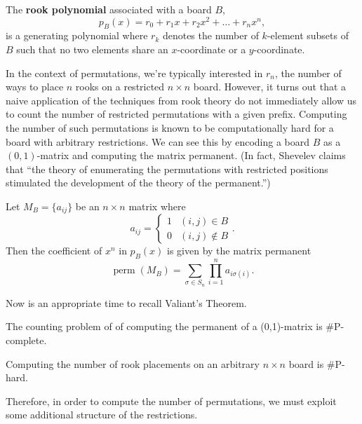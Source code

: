 \begin{definition}
  The \textbf{rook polynomial} associated with a board $B$,
  \[
    p_B(x) = r_0 + r_1 x + r_2 x^2 + \dots + r_n x^n,
  \]
  is a generating polynomial where $r_k$ denotes the number of $k$-element subsets
  of $B$ such that no two elements share an $x$-coordinate or a $y$-coordinate.
\end{definition}

In the context of permutations, we're typically interested in $r_n$, the number
of ways to place $n$ rooks on a restricted $n \times n$ board.
However, it turns out that a naive application of the techniques from
rook theory do not immediately allow us to count the number of
restricted permutations with a given prefix.
Computing the number of such permutations is known to be computationally hard
for a board with arbitrary restrictions.
We can see this by encoding a board $B$ as a $(0,1)$-matrix and computing the matrix
permanent. (In fact, Shevelev \cite{Shevelev1992} claims that
``the theory of enumerating the permutations with restricted positions
stimulated the development of the theory of the permanent.'')

\begin{lemma}
  Let $M_B = \{a_{ij}\}$ be an $n \times n$ matrix where \[
    a_{ij} = \begin{cases}
      1 & (i,j) \in B \\
      0 & (i,j) \not\in B
    \end{cases}.
  \]
  Then the coefficient of $x^n$ in $p_B(x)$ is given by the matrix permanent
  \[
    \operatorname{perm}(M_B) = \sum_{\sigma \in S_n} \prod_{i=1}^n a_{i\sigma(i)}.
  \]
\end{lemma}

Now is an appropriate time to recall Valiant's Theorem.

\begin{theorem}
  The counting problem of of computing the permanent of a (0,1)-matrix is \#P-complete.
\end{theorem}

\begin{corollary}
  Computing the number of rook placements on an arbitrary $n \times n$ board is
  \#P-hard.
\end{corollary}

Therefore, in order to compute the number of permutations, we must exploit some
additional structure of the restrictions.

